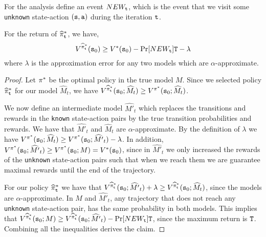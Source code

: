 For the analysis define an event $NEW_{\tt t}$, which is the event that we
visit some \texttt{unknown} state-action $({\tt s},{\tt a})$ during the iteration ${\tt t}$.
\begin{claim}
For the return of $\widehat{\pi}^*_{\tt t}$, we have,
\[
V^{\widehat{\pi}^*_{\tt t}}({\tt s}_0)\geq V^*({\tt s}_0) -
\Pr[NEW_{\tt t}]{\tt T}-\lambda
\]
where $\lambda$ is the approximation error for any two models which are $\alpha$-approximate.
\end{claim}

\begin{proof}
Let $\pi^*$ be the optimal policy in the true model $M$. Since we selected policy $\widehat{\pi}^*_{\tt t}$ for our model $\widehat{M}_t$, we have $V^{\widehat{\pi}^*_{\tt t}}({\tt s}_0;\widehat{M}_t)\geq V^{\pi^*}({\tt s}_0;\widehat{M}_t)$. 

We now define an intermediate model $\widehat{M'}_t$ which replaces the transitions and rewards in the \texttt{known} state-action pairs by the true transition probabilities and rewards. We have that $\widehat{M'}_t$ and $\widehat{M}_t$ are $\alpha$-approximate.
By the definition of $\lambda$ we have $V^{\pi^*}({\tt s}_0;\widehat{M}_t)\geq V^{\pi^*}({\tt s}_0;\widehat{M'}_t)-\lambda$. In addition, $V^{\pi^*}({\tt s}_0;\widehat{M'}_t)\geq V^{\pi^*}({\tt s}_0;M)=V^*({\tt s}_0)$, since in $\widehat{M'}_t$ we only increased the rewards of the \texttt{unknown} state-action pairs such that when we reach them we are guarantee maximal rewards until the end of the trajectory.

For our policy $\widehat{\pi}^*_{\tt t}$ we have that 
 $V^{\widehat{\pi}^*_{\tt t}}({\tt s}_0;\widehat{M'}_t)+\lambda\geq V^{\widehat{\pi}^*_{\tt t}}({\tt s}_0;\widehat{M}_t)$, since the models are $\alpha$-approximate.
%
In $M$ and $\widehat{M'}_t$, any trajectory that does not reach any \texttt{unknown} state-action pair, has the same probability in both models. This implies that 
  $V^{\widehat{\pi}^*_{\tt t}}({\tt s}_0;M)\geq V^{\widehat{\pi}^*_{\tt t}}({\tt s}_0;\widehat{M'}_t)-\Pr[NEW_{\tt t}]{\tt T}$, since the maximum return is ${\tt T}$. Combining all the inequalities derives the claim.
\end{proof}



